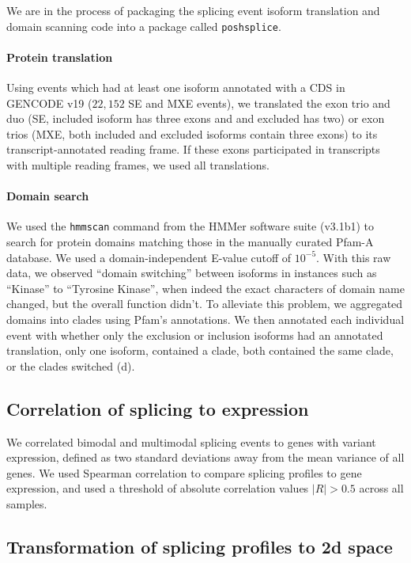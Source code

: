 We are in the process of packaging the splicing event isoform translation and domain scanning code into a package called \texttt{poshsplice}\cite{Anonymous:poshsplice}.

\paragraph{Protein translation}
Using events which had at least one isoform annotated with a CDS in GENCODE v19 ($22,152$ SE and MXE events), we translated the exon trio and duo (SE, included isoform has three exons and and excluded has two) or exon trios (MXE, both included and excluded isoforms contain three exons) to its transcript-annotated reading frame. If these exons participated in transcripts with multiple reading frames, we used all translations.

\paragraph{Domain search} We used the \texttt{hmmscan} command from the HMMer\cite{Finn:2011eg,Eddy:1998ut} software suite (v3.1b1) to search for protein domains matching those in the manually curated Pfam-A database\cite{Finn:2016bf}. We used a domain-independent E-value cutoff of $10^{-5}$. With this raw data, we observed ``domain switching'' between isoforms in instances such as ``Kinase'' to ``Tyrosine Kinase'', when indeed the exact characters of domain name changed, but the overall function didn't. To alleviate this problem, we aggregated domains into clades using Pfam's annotations. We then annotated each individual event with whether only the exclusion or inclusion isoforms had an annotated translation, only one isoform, contained a clade, both contained the same clade, or the clades switched (d).

\subsection{Correlation of splicing to expression}
We correlated bimodal and multimodal splicing events to genes with variant expression, defined as two standard deviations away from the mean variance of all genes. We used Spearman correlation to compare splicing profiles to gene expression, and used a threshold of absolute correlation values $|R| > 0.5$ across all samples.

\subsection{Transformation of splicing profiles to 2d space}

